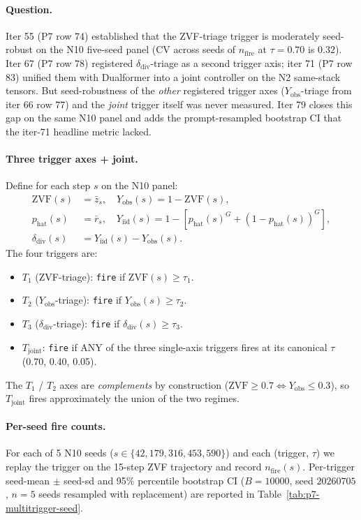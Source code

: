 \documentclass{article}
\begin{document}
\paragraph{Question.}
Iter 55 (P7 row 74) established that the ZVF-triage trigger is
moderately seed-robust on the N10 five-seed panel (CV across seeds of
$n_{\mathrm{fire}}$ at $\tau{=}0.70$ is $0.32$).  Iter 67 (P7 row 78)
registered $\delta_{\mathrm{div}}$-triage as a second trigger axis;
iter 71 (P7 row 83) unified them with Dualformer into a joint
controller on the N2 same-stack tensors.  But seed-robustness of the
\emph{other} registered trigger axes ($Y_{\mathrm{obs}}$-triage from
iter 66 row 77) and the \emph{joint} trigger itself was never
measured.  Iter 79 closes this gap on the same N10 panel and adds
the prompt-resampled bootstrap CI that the iter-71 headline metric
lacked.

\paragraph{Three trigger axes + joint.}
Define for each step $s$ on the N10 panel:
\begin{align*}
\mathrm{ZVF}(s)      &= \bar z_s, \quad
Y_{\mathrm{obs}}(s)  = 1 - \mathrm{ZVF}(s), \\
p_{\mathrm{hat}}(s)  &= \bar r_s, \quad
Y_{\mathrm{iid}}(s)  = 1 - [p_{\mathrm{hat}}(s)^G + (1-p_{\mathrm{hat}}(s))^G], \\
\delta_{\mathrm{div}}(s) &= Y_{\mathrm{iid}}(s) - Y_{\mathrm{obs}}(s).
\end{align*}
The four triggers are:
\begin{itemize}\itemsep0pt
  \item $T_1$ (ZVF-triage): \texttt{fire} if $\mathrm{ZVF}(s) \geq \tau_1$.
  \item $T_2$ ($Y_{\mathrm{obs}}$-triage): \texttt{fire} if
        $Y_{\mathrm{obs}}(s) \geq \tau_2$.
  \item $T_3$ ($\delta_{\mathrm{div}}$-triage): \texttt{fire} if
        $\delta_{\mathrm{div}}(s) \geq \tau_3$.
  \item $T_{\mathrm{joint}}$: \texttt{fire} if ANY of the three single-axis
        triggers fires at its canonical $\tau$ (0.70, 0.40, 0.05).
\end{itemize}
The $T_1$ / $T_2$ axes are \emph{complements} by construction
($\mathrm{ZVF} \geq 0.7 \Leftrightarrow Y_{\mathrm{obs}} \leq 0.3$),
so $T_{\mathrm{joint}}$ fires approximately the union of the two
regimes.

\paragraph{Per-seed fire counts.}
For each of 5 N10 seeds ($s \in \{42, 179, 316, 453, 590\}$) and each
(trigger, $\tau$) we replay the trigger on the 15-step ZVF
trajectory and record $n_{\mathrm{fire}}(s)$.  Per-trigger seed-mean
$\pm$ seed-sd and 95\% percentile bootstrap CI ($B{=}10000$,
seed $20260705$, $n{=}5$ seeds resampled with replacement) are
reported in Table~\ref{tab:p7-multitrigger-seed}.
\end{document}
